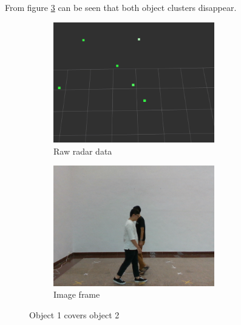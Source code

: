 From figure \ref*{fig:concealing_fig} can be seen that both object clusters disappear.
\begin{figure}[hbpt]
    \centering
    \begin{subfigure}{0.3\linewidth}
        \includegraphics[width=7cm]{Figures/concealing_radar.png}
        \caption{Raw radar data}
        \label{subfig:concealing_radar_fig}
    \end{subfigure}
    \hspace{0.15\textwidth}
    \begin{subfigure}{0.3\linewidth}
        \includegraphics[width=7cm]{Figures/concealing_image.png}
        \caption{Image frame}
        \label{subfig:concealing_image_fig}
    \end{subfigure}

    \caption{Object 1 covers object 2}
    \label{fig:concealing_fig}
\end{figure}

